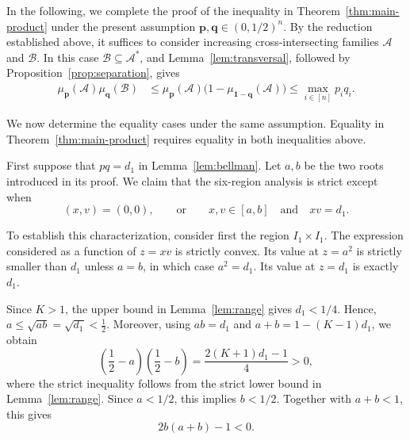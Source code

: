 \documentclass[11pt]{article}
\numberwithin{equation}{section}
\theoremstyle{definition}
\theoremstyle{remark}
\begin{document}
In the following, we complete the proof of the inequality in
Theorem~\ref{thm:main-product} under the present assumption
$
 \mathbf p,\mathbf q\in(0,1/2)^n.
$
By the reduction established above, it suffices to consider increasing
cross-intersecting families $\mathcal{A}$ and $\mathcal{B}$.  In this
case $\mathcal{B}\subseteq\mathcal{A}^*$, and
Lemma~\ref{lem:transversal}, followed by
Proposition~\ref{prop:separation}, gives
\begin{align*}
 \mu_{\mathbf p}(\mathcal{A})\mu_{\mathbf q}(\mathcal{B})
 &\leq
 \mu_{\mathbf p}(\mathcal{A})
 \bigl(1-\mu_{\mathbf 1-\mathbf q}(\mathcal{A})\bigr)\leq
 \max_{i\in[n]}p_iq_i.
\end{align*}

We now determine the equality cases under the same assumption.  Equality
in Theorem~\ref{thm:main-product} requires equality in both inequalities
above.  

 First suppose that $pq=d_1$ in
Lemma~\ref{lem:bellman}. Let $a,b$ be the two roots introduced in its
proof. We claim that the six-region analysis is strict except when
\begin{equation}
 (x,v)=(0,0),
 \qquad\text{or}\qquad
 x,v\in[a,b]\quad\text{and}\quad xv=d_1.
 \label{eq:bellman-equality-points}
\end{equation}

To establish this characterization, consider first the region
$I_1\times I_1$. The expression considered as a function
of $z=xv$ is strictly convex. Its value at $z=a^2$ is strictly smaller
than $d_1$ unless $a=b$, in which case $a^2=d_1$. Its value at
$z=d_1$ is exactly $d_1$.

Since $K>1$, the upper bound in Lemma~\ref{lem:range} gives
$d_1<1/4$.  Hence,
$
 a\leq\sqrt{ab}=\sqrt{d_1}<\frac12.
$
Moreover, using $ab=d_1$ and
$a+b=1-(K-1)d_1$, we obtain
\[
 \left(\frac12-a\right)\left(\frac12-b\right)
 =
 \frac{2(K+1)d_1-1}{4}>0,
\]
where the strict inequality follows from the strict lower bound in
Lemma~\ref{lem:range}.  
Since $a<1/2$, this implies $b<1/2$. Together with $a+b<1$, this gives
\begin{equation*}
 2b(a+b)-1<0.
\end{equation*}
\end{document}
